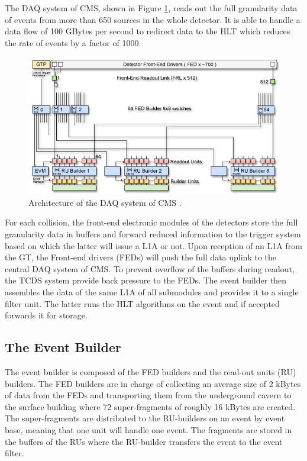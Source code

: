     The DAQ system of CMS, shown in Figure \ref{fig:I-3-daq}, reads out the full granularity data of events from more than 650 sources in the whole detector. It is able to handle a data flow of 100 GBytes per second to redirect data to the HLT which reduces the rate of events by a factor of 1000. \\

      \begin{figure}[h!]
        \centering
        \includegraphics[width=\textwidth]{img/I-3-cms/daq.jpg}
        \caption{Architecture of the DAQ system of CMS \cite{1748-0221-3-08-S08004}.}
        \label{fig:I-3-daq}
      \end{figure}

    For each collision, the front-end electronic modules of the detectors store the full granularity data in buffers and forward reduced information to the trigger system based on which the latter will issue a L1A or not. Upon reception of an L1A from the GT, the Front-end drivers (FEDs) will push the full data uplink to the central DAQ system of CMS. To prevent overflow of the buffers during readout, the TCDS system provide back pressure to the FEDs. The event builder then assembles the data of the same L1A of all submodules and provides it to a single filter unit. The latter runs the HLT algorithms on the event and if accepted forwards it for storage.

    \subsection{The Event Builder}

      The event builder is composed of the FED builders and the read-out units (RU) builders. The FED builders are in charge of collecting an average size of 2 kBytes of data from the FEDs and transporting them from the underground cavern to the surface building where 72 super-fragments of roughly 16 kBytes are created. The super-fragments are distributed to the RU-builders on an event by event base, meaning that one unit will handle one event. The fragments are stored in the buffers of the RUs where the RU-builder transfers the event to the event filter.

